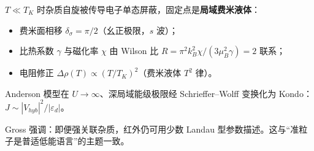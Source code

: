 $T\ll T_K$ 时杂质自旋被传导电子单态屏蔽，固定点是\textbf{局域费米液体}：
\begin{itemize}
  \item 费米面相移 $\delta_\sigma=\pi/2$（幺正极限，$s$ 波）；
  \item 比热系数 $\gamma$ 与磁化率 $\chi$ 由 Wilson 比
  $R=\pi^2 k_B^2\chi/(3\mu_B^2\gamma)=2$ 联系；
  \item 电阻修正 $\Delta\rho(T)\propto(T/T_K)^2$（费米液体 $T^2$ 律）。
\end{itemize}
Anderson 模型在 $U\to\infty$、深局域能级极限经 Schrieffer--Wolff 变换化为 Kondo：$J\sim |V_{hyb}|^2/|\varepsilon_d|$。

\begin{note}
Gross 强调：即便强关联杂质，红外仍可用少数 Landau 型参数描述。这与“准粒子是普适低能语言”的主题一致。
\end{note}

